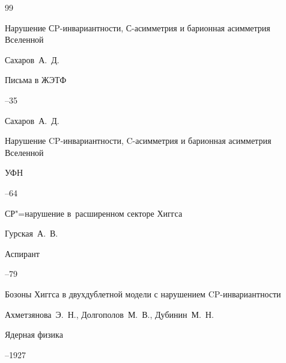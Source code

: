 \begin{thebibliography}{99}

\paper Нарушение СP-инвариантности, С-асимметрия и барионная асимметрия Вселенной

\by Сахаров~А.~Д. 

\jour Письма в ЖЭТФ 



--35

\morerref

\by Сахаров~А.~Д.

\paper Нарушение CP-инвариантности, C-асимметрия и барионная асимметрия Вселенной

\jour УФН 



–64 






\paper СР"=нарушение в~расширенном секторе Хиггса 

\by Гурская~А.~В. 

\jour Аспирант



--79





\paper Бозоны Хиггса в двухдублетной модели с нарушением CP-инвариантности 

\by Ахметзянова~Э.~Н., Долгополов~М.~В., Дубинин~М.~Н. 

\jour Ядерная физика




--1927


%






\end{thebibliography}

